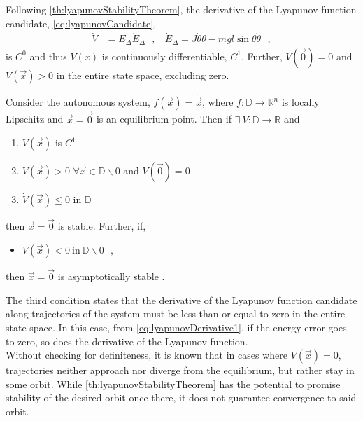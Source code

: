 Following \autoref{th:lyapunovStabilityTheorem}, the derivative of the Lyapunov function candidate, \autoref{eq:lyapunovCandidate},
\begin{align}
  \dot{V} &= E_\Delta \dot{E}_\Delta  \ \ \ ,\ \ \ \ \dot{E}_\Delta = J \dot{\theta} \ddot{\theta} - m g l \sin \theta \dot{\theta}  \ \ \ ,  \label{eq:lyapunovDerivative1}
\end{align}
is $C^0$ and thus $V(x)$ is continuously differentiable, $C^1$. Further, $V(\vec{0}) = 0$ and $V(\vec{x})>0$ in the entire state space, excluding zero.
%
\begin{theorem}
  \label{th:lyapunovStabilityTheorem}
  Consider the autonomous system, $f(\vec{x}) = \dot{\vec{x}}$, where $f : \mathbb{D} \rightarrow \mathbb{R} ^n$ is locally Lipschitz and $\vec{x}=\vec{0}$ is an equilibrium point. Then if $\exists\ V : \mathbb{D} \rightarrow \mathbb{R}$ and \vspace{-12pt}
  \begin{enumerate}
    \item $V(\vec{x})$ is $C^1$
    \item $V(\vec{x}) > 0$ $\forall \vec{x} \in \mathbb{D}\backslash 0$ and $V(\vec{0}) = 0$
    \item $\dot{V}(\vec{x}) \leq 0$ in $\mathbb{D}$
  \end{enumerate} \vspace{-12pt}
  then $\vec{x} = \vec{0}$ is stable. Further, if,
  \vspace{-12pt}
  \begin{itemize}
    \item[] $ \dot{V}(\vec{x}) < 0\ \mathrm{in}\ \mathbb{D}\backslash 0  \ \ \ ,  $
  \end{itemize}\vspace{-12pt}
  then $\vec{x} = \vec{0}$ is asymptotically stable \cite{HKKhalil}.
\end{theorem}\vspace{-12pt}
%
The third condition states that the derivative of the Lyapunov function candidate along trajectories of the system must be less than or equal to zero in the entire state space. In this case, from \autoref{eq:lyapunovDerivative1}, if the energy error goes to zero, so does the derivative of the Lyapunov function.\\
Without checking for definiteness, it is known that in cases where $V(\vec{x}) = 0$, trajectories neither approach nor diverge from the equilibrium, but rather stay in some orbit. While \autoref{th:lyapunovStabilityTheorem} has the potential to promise stability of the desired orbit once there, it does not guarantee convergence to said orbit.\\
